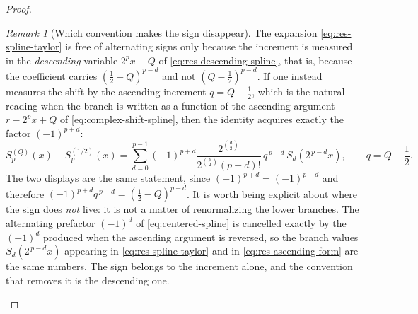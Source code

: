 \documentclass[11pt,oneside]{article}
\theoremstyle{definition}
\theoremstyle{remark}
\newtheorem{remark}[theorem]{Remark}
\begin{document}
\begin{proof}
\begin{remark}[Which convention makes the sign disappear]
\label{rem:res-sign-convention}
The expansion \eqref{eq:res-spline-taylor} is free of alternating signs only because the
increment is measured in the \emph{descending} variable $2^px-Q$ of
\eqref{eq:res-descending-spline}, that is, because the coefficient carries
$\left(\tfrac12-Q\right)^{p-d}$ and not $\left(Q-\tfrac12\right)^{p-d}$.  If one instead
measures the shift by the ascending increment $q=Q-\tfrac12$, which is the natural reading
when the branch is written as a function of the ascending argument $r-2^px+Q$ of
\eqref{eq:complex-shift-spline}, then the identity acquires exactly the factor
$(-1)^{p+d}$:
\begin{equation}
 S_p^{(Q)}(x)-S_p^{(1/2)}(x)
 =\sum_{d=0}^{p-1}(-1)^{p+d}
 \frac{2^{\binom d2}}{2^{\binom p2}(p-d)!}\,
 q^{\,p-d}\,S_d\!\left(2^{\,p-d}x\right),
 \qquad q=Q-\frac12.                                      \label{eq:res-ascending-form}
\end{equation}
The two displays are the same statement, since $(-1)^{p+d}=(-1)^{p-d}$ and therefore
$(-1)^{p+d}q^{\,p-d}=\left(\tfrac12-Q\right)^{p-d}$.  It is worth being explicit about where
the sign does \emph{not} live: it is not a matter of renormalizing the lower branches.  The
alternating prefactor $(-1)^d$ of \eqref{eq:centered-spline} is cancelled exactly by the
$(-1)^d$ produced when the ascending argument is reversed, so the branch values
$S_d(2^{\,p-d}x)$ appearing in \eqref{eq:res-spline-taylor} and in
\eqref{eq:res-ascending-form} are the same numbers.  The sign belongs to the increment
alone, and the convention that removes it is the descending one.
\end{remark}


\end{proof}
\end{document}
